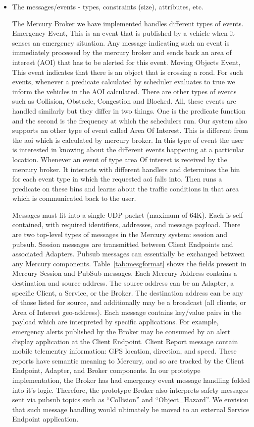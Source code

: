 \begin{itemize}
\item The messages/events - types, constraints (size), attributes, etc.

The Mercury Broker we have implemented handles different types of events. 
Emergency Event, This is an event that is published by a vehicle when it senses
an emergency situation. Any message indicating such an event is immediately 
processed by the mercury broker and sends back an area of interest (AOI)
that has to be alerted for this event.
Moving Objects Event, This event indicates that there is an object that is 
crossing a road. For such events, whenever a predicate calculated by scheduler 
evaluates to true we inform the vehicles in the AOI calculated.
There are other types of events such as Collision, Obstacle, Congestion and 
Blocked. All, these events are handled similarly but they differ in two things.
One is the predicate function and the second is the frequency at which the 
schedulers run. Our system also supports an other type of event called 
Area Of Interest. This is different from the aoi which is calculated by
mercury broker. In this type of event the user is interested in knowing about 
the different events happening at a particular location. Whenever an event of 
type area Of interest is received by the mercury broker. It interacts with 
different handlers and determines the bin for each event type in which the 
requested aoi falls into. Then runs a predicate on these bins and learns about 
the traffic conditions in that area which is communicated back to the user.

Messages must fit into a single UDP packet (maximum of 64K).  Each is
self contained, with required identifiers, addresses, and message
payload.  There are two top-level types of messages in the Mercury
system: session and pubsub.  Session messages are transmitted between
Client Endpoints and associated Adapters.  Pubsub messages can
essentially be exchanged between any Mercury components.
Table~\ref{tab:mesgformat} shows the fields present in Mercury Session
and PubSub messages. Each Mercury Address contains a destination and
source address.  The source address can be an Adapter, a specific
Client, a Service, or the Broker.  The destination address can be any
of those listed for source, and additionally may be a broadcast (all
clients, or Area of Interest geo-address).  Each message contains
key/value pairs in the payload which are interpreted by specific
applications. For example, emergency alerts published by the Broker
may be consumed by an alert display application at the Client
Endpoint.  Client Report message contain mobile telementry
information: GPS location, direction, and speed. These reports have
semantic meaning to Mercury, and so are tracked by the Client
Endpoint, Adapter, and Broker components.  In our prototype
implementation, the Broker has had emergency event message handling
folded into it's logic.  Therefore, the prototype Broker also
interprets safety messages sent via pubsub topics such as
``Collision'' and ``Object\_Hazard''. We envision that such message
handling would ultimately be moved to an external Service Endpoint
application.


\end{itemize}
